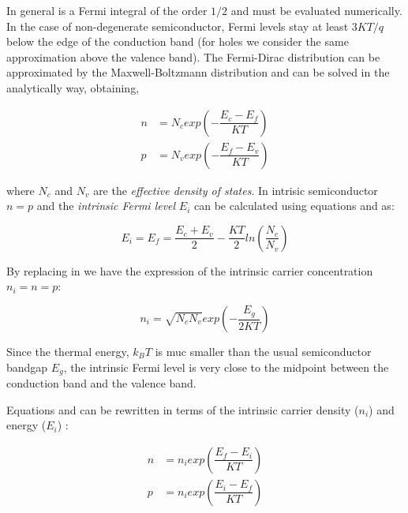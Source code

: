  In general  is a Fermi integral of the order $1/2$ and must be evaluated numerically. In the case of non-degenerate semiconductor, Fermi levels stay at least $3KT/q$ below the edge of the conduction band (for holes we consider the same approximation above the valence band).  The Fermi-Dirac distribution can be approximated by the Maxwell-Boltzmann distribution and  can be solved in the analytically way, obtaining,

\begin{align}
n & = N_c exp\left(-\dfrac{E_c-E_f}{KT}\right) \label{eq: n density fd}\\
p & = N_v exp\left(-\dfrac{E_f-E_v}{KT}\right)  \label{eq: p density fd}
\end{align}

where $N_c$ and $N_v$ are the \textit{effective density of states}.
In intrisic semiconductor $n=p$ and the \textit{intrinsic Fermi level} $E_i$ can be calculated using equations  and  as:

\begin{equation}
\label{eq: midgap equilibrium}
E_i=E_f=\dfrac{E_c+E_v}{2} - \dfrac{KT}{2}ln\left(\dfrac{N_c}{N_v}\right)
\end{equation}

By replacing  in  we have the expression of the intrinsic carrier concentration $n_i=n=p$:


\begin{equation}
\label{eq: ni equilibrium NcNv}
n_i = \sqrt{N_cN_v}exp\left(-\dfrac{E_g}{2KT}\right)
\end{equation}

\begin{Osservazione}
Since the thermal energy, $k_BT$ is muc smaller than the usual semiconductor bandgap $E_g$, the intrinsic Fermi level is very close to the midpoint between the conduction band and the valence band.
\end{Osservazione}

Equations  and  can be rewritten in terms of the intrinsic carrier density ($n_i$) and energy ($E_i$) :

\begin{align}
n & = n_i exp\left(\dfrac{E_f-E_i}{KT}\right) \label{eq: n density mb}\\
p & = n_i exp\left(\dfrac{E_i-E_f}{KT}\right)  \label{eq: p density mb}
\end{align}

